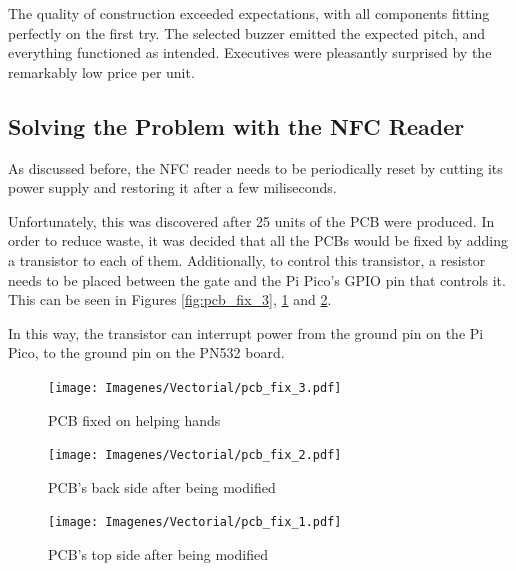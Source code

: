 The quality of construction exceeded expectations, with all components fitting perfectly on the first try. 
The selected buzzer emitted the expected pitch, and everything functioned as intended. Executives were 
pleasantly surprised by the remarkably low price per unit.


\subsection*{Solving the Problem with the NFC Reader}

As discussed before, the NFC reader needs to be periodically reset by cutting its power supply and 
restoring it after a few miliseconds.

Unfortunately, this was discovered after 25 units of the PCB were produced. In order to reduce waste, it 
was decided that all the PCBs would be fixed by adding a transistor to each of them. Additionally, to 
control this transistor, a resistor needs to be placed between the gate and the Pi Pico's GPIO pin that 
controls it. This can be seen in Figures \ref{fig:pcb_fix_3}, \ref{fig:pcb_fix_2} and \ref{fig:pcb_fix_1}.

In this way, the transistor can interrupt power from the ground pin on the Pi Pico, to the ground pin on 
the PN532 board.

\begin{figure}[h]
    \centering
    \begin{minipage}[b]{0.45\textwidth}
        \centering
        \texttt{[image: Imagenes/Vectorial/pcb\_fix\_3.pdf]}
        \caption{PCB fixed on helping hands}
        \label{fig:pcb_fix_3}
    \end{minipage}
    \hfill
    \begin{minipage}[b]{0.45\textwidth}
        \centering
        \texttt{[image: Imagenes/Vectorial/pcb\_fix\_2.pdf]}
        \caption{PCB's back side after being modified}
        \label{fig:pcb_fix_2}
    \end{minipage}
\end{figure}

\begin{figure}[h]
    \centering
    \begin{minipage}[b]{0.7\textwidth}
        \centering
        \texttt{[image: Imagenes/Vectorial/pcb\_fix\_1.pdf]}
        \caption{PCB's top side after being modified}
        \label{fig:pcb_fix_1}
    \end{minipage}
\end{figure}